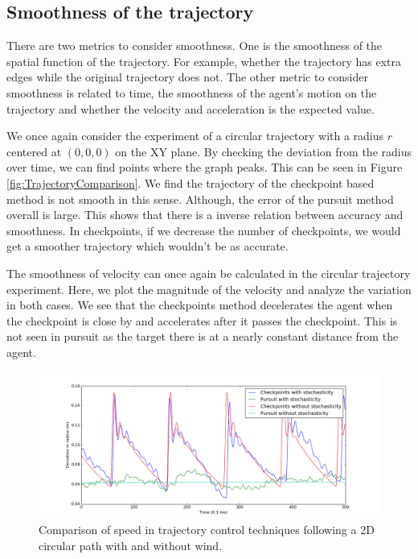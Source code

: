 \documentclass[hidelinks,BTech]{iitmdiss}
\begin{document}
\subsection{Smoothness of the trajectory}
There are two metrics to consider smoothness. One is the smoothness of the spatial function of the trajectory. For example, whether the trajectory has extra edges while the original trajectory does not. The other metric to consider smoothness is related to time, the smoothness of the agent's motion on the trajectory and whether the velocity and acceleration is the expected value.

We once again consider the experiment of a circular trajectory with a radius $r$ centered at $(0,0,0)$ on the XY plane. By checking the deviation from the radius over time, we can find points where the graph peaks. This can be seen in Figure \ref{fig:TrajectoryComparison}. We find the trajectory of the checkpoint based method is not smooth in this sense. Although, the error of the pursuit method overall is large. This shows that there is a inverse relation between accuracy and smoothness. In checkpoints, if we decrease the number of checkpoints, we would get a smoother trajectory which wouldn't be as accurate.

The smoothness of velocity can once again be calculated in the circular trajectory experiment. Here, we plot the magnitude of the velocity and analyze the variation in both cases. We see that the checkpoints method decelerates the agent when the checkpoint is close by and accelerates after it passes the checkpoint. This is not seen in pursuit as the target there is at a nearly constant distance from the agent.

\begin{figure}[H]
  \centering
    \includegraphics[width=\textwidth]{comparison_velocity.png}
    \caption{Comparison of speed in trajectory control techniques following a 2D circular path with and without wind.}
\end{figure}
\end{document}
